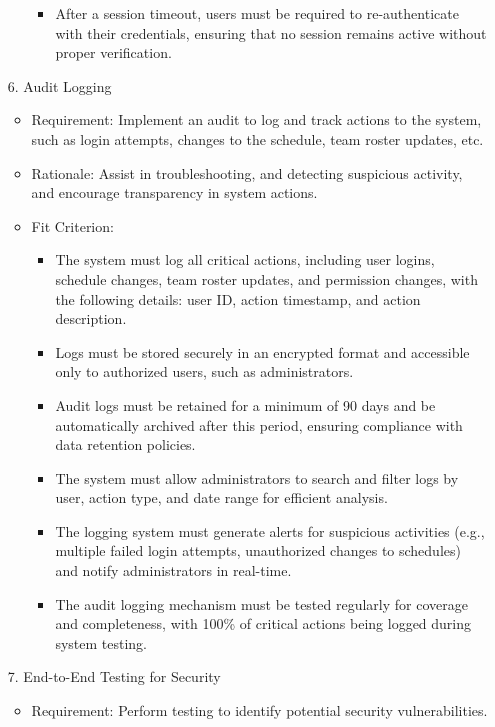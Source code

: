 \documentclass{article}
\begin{document}
\begin{enumerate}
\begin{itemize}
\begin{itemize}
                \item After a session timeout, users must be required to re-authenticate with their credentials, ensuring that no session remains active without proper verification.
            \end{itemize}
        \end{itemize}
    \item[6.] Audit Logging
        \begin{itemize}
            \item Requirement: Implement an audit to log and track actions to the system, such as login attempts, changes to the schedule, team roster updates, etc.
            \item Rationale: Assist in troubleshooting, and detecting suspicious activity, and encourage transparency in system actions.
            \item Fit Criterion:
            \begin{itemize}
                \item The system must log all critical actions, including user logins, schedule changes, team roster updates, and permission changes, with the following details: user ID, action timestamp, and action description.
                \item Logs must be stored securely in an encrypted format and accessible only to authorized users, such as administrators.
                \item Audit logs must be retained for a minimum of 90 days and be automatically archived after this period, ensuring compliance with data retention policies.
                \item The system must allow administrators to search and filter logs by user, action type, and date range for efficient analysis.
                \item The logging system must generate alerts for suspicious activities (e.g., multiple failed login attempts, unauthorized changes to schedules) and notify administrators in real-time.
                \item The audit logging mechanism must be tested regularly for coverage and completeness, with 100\% of critical actions being logged during system testing.
            \end{itemize}
        \end{itemize}
    \item[7.] End-to-End Testing for Security
        \begin{itemize}
            \item Requirement: Perform testing to identify potential security vulnerabilities.

\end{itemize}
\end{enumerate}
\end{document}
